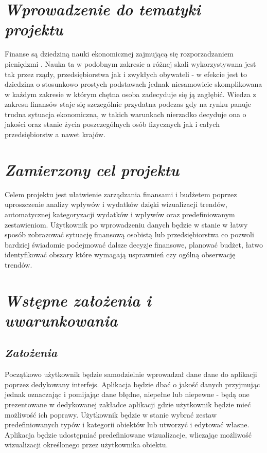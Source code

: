\documentclass[a4paper,12pt]{report}
\newcommand{\customstylechapter}[1]{\large{\textit{#1}}}
\newcommand{\customstylesection}[1]{\textbf{\textit{#1}}}
\begin{document}
\renewcommand*\contentsname{Spis treści}
\tableofcontents                    %


\chapter{\customstylechapter{Wprowadzenie do tematyki projektu}}
{Finanse są dziedziną nauki ekonomicznej zajmującą się rozporzadzaniem pieniędzmi
 \cite{wiki_ekonomia}. Nauka ta w podobnym zakresie a różnej skali 
wykorzystywana jest tak przez rządy, przedsiębiorstwa jak i zwykłych obywateli - 
w efekcie jest to dziedzina o stosunkowo prostych podstawach jednak niesamowicie
skomplikowana w każdym zakresie w którym chętna osoba zadecyduje się ją zagłębić. 
Wiedza z zakresu finansów staje się szczególnie przydatna podczas gdy na rynku 
panuje trudna sytuacja ekonomiczna, w takich warunkach nierzadko decyduje ona o 
jakości oraz stanie życia poszczególnych osób fizycznych jak i całych 
przedsiębiorstw a nawet krajów.}
%
\chapter{\customstylechapter{Zamierzony cel projektu}}
{Celem projektu jest ułatwienie zarządzania finansami i budżetem poprzez 
uproszczenie analizy wpływów i wydatków dzięki wizualizacji trendów, 
automatycznej kategoryzacji wydatków i wpływów oraz predefiniowanym 
zestawieniom. Użytkownik po wprowadzeniu danych będzie w stanie w łatwy sposób 
zobrazować sytuację finansową osobistą lub przedsiębiorstwa co pozwoli 
bardziej świadomie podejmować dalsze decyzje finansowe, planować budżet, łatwo 
identyfikować obszary które wymagają usprawnień czy ogólną obserwację trendów.}
%
\chapter{\customstylechapter{Wstępne założenia i uwarunkowania}}
\section{\customstylesection{Założenia}}
{Początkowo użytkownik będzie samodzielnie wprowadzał dane dane do aplikacji 
poprzez dedykowany interfejs. Aplikacja będzie dbać o jakość danych przyjmując 
jednak oznaczając i pomijając dane błędne, niepełne lub niepewne - będą one 
prezentowane w dedykowanej zakładce aplikacji gdzie użytkownik będzie mieć 
możliwość ich poprawy. Użytkownik będzie w stanie wybrać zestaw 
predefiniowanych typów i kategorii obiektów lub utworzyć i edytować własne. 
Aplikacja będzie udostępniać predefiniowane wizualizacje, wliczając możliwość 
wizualizacji określonego przez użytkownika obiektu.}
%
\end{document}
